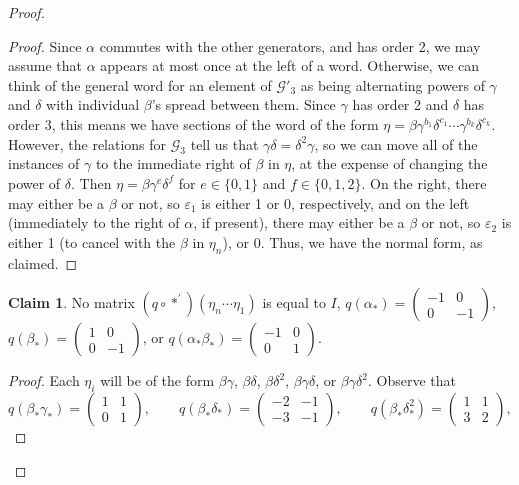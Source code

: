 \documentclass{amsart}     %
\theoremstyle{definition}
\newtheorem{claim}[thm]{Claim}
\begin{document}
\begin{proof}
\begin{description}
\begin{proof}
Since $\alpha$ commutes with the other generators, and has order 2, we may assume that $\alpha$ appears at most once at the left of a word. Otherwise, we can think of the general word for an element of $\mathcal{G}'_3$ as being alternating powers of $\gamma$ and $\delta$ with individual $\beta$'s spread between them. Since $\gamma$ has order 2 and $\delta$ has order 3, this means we have sections of the word of the form $\eta = \beta \gamma^{b_1}\delta^{c_1} \cdots \gamma^{b_k} \delta^{c_k}$. However, the relations for $\mathcal G_3$ tell us that $\gamma \delta  = \delta^{2} \gamma$, so we can move all of the instances of $\gamma$ to the immediate right of $\beta$ in $\eta$, at the expense of changing the power of $\delta$. Then $\eta = \beta \gamma^{e} \delta^{f}$ for $e \in \{0,1\}$ and $f \in \{0,1,2\}$. On the right, there may either be a $\beta$ or not, so $\varepsilon_1$ is either 1 or 0, respectively, and on the left (immediately to the right of $\alpha$, if present), there may either be a $\beta$ or not, so $\varepsilon_2$ is either 1 (to cancel with the $\beta$ in $\eta_n$), or 0. Thus, we have the normal form, as claimed. 
\end{proof}

\begin{claim}
\label{claim:allposallneg}
No matrix $\left( q \circ *^{'} \right) \left( \eta_n \cdots \eta_1 \right)  $ is equal to $I$, $q(\alpha_*) = \begin{pmatrix} -1 & 0 \\ 0 & -1 \end{pmatrix}$, $q(\beta_*) = \begin{pmatrix} 1 & 0 \\ 0 & -1 \end{pmatrix}$, or $q(\alpha_* \beta_*) = \begin{pmatrix} -1 & 0 \\ 0 & 1 \end{pmatrix}$. \end{claim}

\begin{proof}
Each $\eta_i$ will be of the form $\beta \gamma$, $\beta \delta$, $\beta \delta^2$, $\beta \gamma \delta$, or $\beta \gamma \delta^2$. Observe that \[q (\beta_* \gamma_*) = \begin{pmatrix} 1 & 1  \\ 0 & 1\end{pmatrix}, \qquad q (\beta_* \delta_*) = \begin{pmatrix} -2 & -1  \\ -3 & -1\end{pmatrix}, \qquad q  (\beta_* \delta_*^2) = \begin{pmatrix} 1 & 1  \\ 3 & 2\end{pmatrix},\]


\end{proof}
\end{description}
\end{proof}
\end{document}
